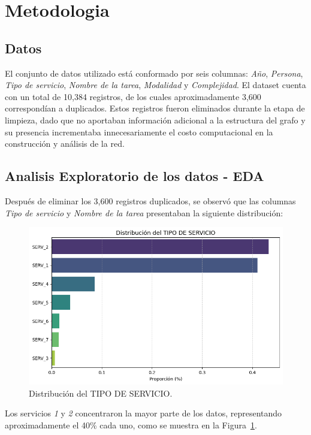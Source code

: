 \documentclass[twocolumn]{article}
\begin{document}
\section{Metodologia}
\subsection{Datos}
El conjunto de datos utilizado está conformado por seis columnas: \textit{Año}, \textit{Persona}, \textit{Tipo de servicio}, \textit{Nombre de la tarea}, \textit{Modalidad} y \textit{Complejidad}. 
El dataset cuenta con un total de 10,384 registros, de los cuales aproximadamente 3,600 correspondían a duplicados. 
Estos registros fueron eliminados durante la etapa de limpieza, dado que no aportaban información adicional a la estructura del grafo y su presencia incrementaba innecesariamente el costo computacional en la construcción y análisis de la red. 

\subsection{Analisis Exploratorio de los datos - EDA}
Después de eliminar los 3,600 registros duplicados, se observó que las columnas \textit{Tipo de servicio} y \textit{Nombre de la tarea} presentaban la siguiente distribución:

\begin{figure}[H]
    \centering
    \includegraphics[width=\columnwidth]{img/DistribucionTipoServicio.png}
    \caption{Distribución del TIPO DE SERVICIO.}
    \label{fig:distribucion_tipo_servicio}
\end{figure}

Los servicios \textit{1} y \textit{2} concentraron la mayor parte de los datos, representando aproximadamente el 40\% cada uno, como se muestra en la Figura~\ref{fig:distribucion_tipo_servicio}.
\end{document}
